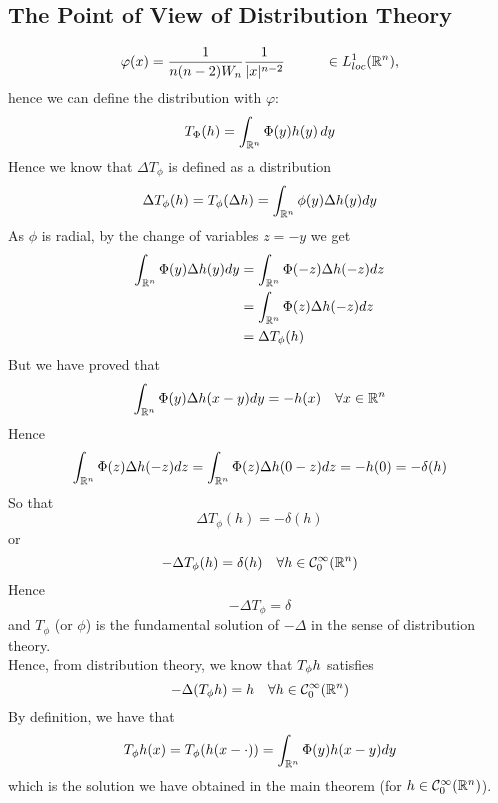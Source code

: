 \subsection{The Point of View of Distribution Theory}
\begin{equation*}
    \varphi (x)= \frac{1}{n(n-2) W_n}\frac{1}{|x|^{n-2}} \hspace{1 cm} \in L_{loc}^1(\mathbb{R}^n),
\end{equation*}
hence we can define the distribution with $\varphi$:
\begin{equation*}
    T_{\Phi}(h)= \int_{\mathbb{R}^n} \Phi (y) h(y) \, dy 
\end{equation*}
Hence we know that $\Delta T_\phi$ is defined as a distribution
\begin{equation*}
    \Delta T_\phi(h) = T_\phi (\Delta h) = \int_{\mathbb{R}^n} \phi(y) \Delta h(y) dy
\end{equation*}
As $\phi$ is radial, by the change of variables $z = -y$ we get
\begin{align*}
    \int_{\mathbb{R}^n} \Phi(y) \Delta h(y)dy &= \int_{\mathbb{R}^n} \Phi(-z) \Delta h(-z) dz \\
    &= \int_{\mathbb{R}^n} \Phi(z) \Delta h(-z) dz \\
    &= \Delta T_\phi(h)
\end{align*}
But we have proved that 
\begin{equation*}
    \int_{\mathbb{R}^n} \Phi(y) \Delta h(x-y)dy = -h(x) \quad \forall x \in \mathbb{R}^n
\end{equation*}
Hence
\begin{equation*}
    \int_{\mathbb{R}^n} \Phi(z) \Delta h(-z)dz = \int_{\mathbb{R}^n} \Phi(z) \Delta h(0-z)dz = -h(0) = - \delta (h)
\end{equation*}
So that 
\begin{equation*}
    \Delta T_\phi(h) = -\delta(h)
\end{equation*}
or 
\begin{equation*}
    -\Delta T_\phi(h) = \delta(h) \quad \forall h \in \mathcal{C}^\infty_0 (\mathbb{R}^n)
\end{equation*}
Hence
\begin{equation*}
    -\Delta T_\phi = \delta
\end{equation*}
and $T_\phi$ (or $\phi$) is the fundamental solution of $-\Delta$ in the sense of distribution theory. \\
Hence, from distribution theory, we know that $T_\phi \* h$ satisfies 
\begin{equation*}
    -\Delta (T_\phi \* h) = h \quad \forall h \in \mathcal{C}^\infty_0 (\mR^n)
\end{equation*}
By definition, we have that 
\begin{equation*}
    T_\phi \* h(x) = T_\phi(h(x-\cdot)) = \int_{\mR^n} \Phi(y) h(x-y) dy
\end{equation*}
which is the solution we have obtained in the main theorem (for $h \in \mathcal{C}^\infty_0(\mathbb{R}^n)$). 
